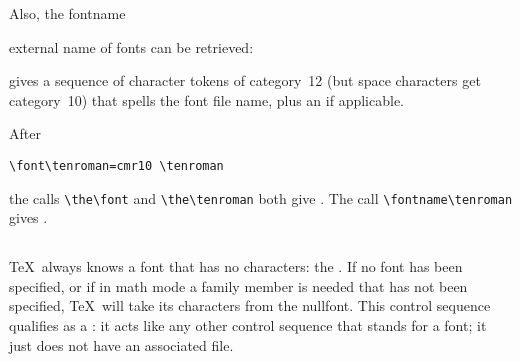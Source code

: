 Also, the 
\cstoidx fontname\par
external name of fonts can be retrieved:
\begin{Disp}\end{Disp}
gives a sequence of character tokens of category~12
(but space characters get category~10) that spells the font file
name, plus an  if applicable.

\begin{example} After
\begin{verbatim}
\font\tenroman=cmr10 \tenroman
\end{verbatim}
the calls
\verb>\the\font> and \verb>\the\tenroman> both give .
The call \verb>\fontname\tenroman> gives .
\end{example}

\subsection{}

\TeX\ always knows a font that has no characters: the .
If no font has been specified, or if in math mode a family member
is needed that has not been specified, 
\TeX\ will take its characters from the nullfont.
This control sequence qualifies as a :
it acts like any other control sequence that stands for a font;
it just does not have an associated  file.

